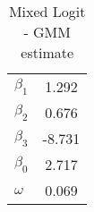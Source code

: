 \begin{table}[htb]
\centering
\caption{Mixed Logit - GMM estimate}\label{tab:mixed-gmm}
\begin{tabular}{lc}
 \hline 
$\beta_1$ & 1.292 \\ 
$\beta_2$ & 0.676 \\ 
$\beta_3$ & -8.731 \\ 
$\beta_0$ & 2.717 \\ 
$\omega$ & 0.069 \\ 
\hline
\end{tabular}
\end{table}

